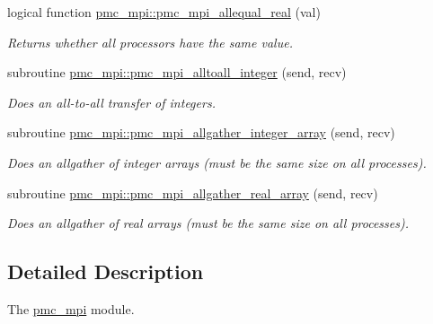\begin{DoxyCompactItemize}
logical function \mbox{\hyperlink{namespacepmc__mpi_a92d80c63cf20c10ce32e2e8e5cb81c18}{pmc\+\_\+mpi\+::pmc\+\_\+mpi\+\_\+allequal\+\_\+real}} (val)
\begin{DoxyCompactList}\small\item\em Returns whether all processors have the same value. \end{DoxyCompactList}\item 
subroutine \mbox{\hyperlink{namespacepmc__mpi_ac7882ff99a49670f3601c32959f517e1}{pmc\+\_\+mpi\+::pmc\+\_\+mpi\+\_\+alltoall\+\_\+integer}} (send, recv)
\begin{DoxyCompactList}\small\item\em Does an all-\/to-\/all transfer of integers. \end{DoxyCompactList}\item 
subroutine \mbox{\hyperlink{namespacepmc__mpi_af79ceb854ff634f821a291c373810765}{pmc\+\_\+mpi\+::pmc\+\_\+mpi\+\_\+allgather\+\_\+integer\+\_\+array}} (send, recv)
\begin{DoxyCompactList}\small\item\em Does an allgather of integer arrays (must be the same size on all processes). \end{DoxyCompactList}\item 
subroutine \mbox{\hyperlink{namespacepmc__mpi_a999792706377ad2876cbf470df97c26d}{pmc\+\_\+mpi\+::pmc\+\_\+mpi\+\_\+allgather\+\_\+real\+\_\+array}} (send, recv)
\begin{DoxyCompactList}\small\item\em Does an allgather of real arrays (must be the same size on all processes). \end{DoxyCompactList}\end{DoxyCompactItemize}


\subsection{Detailed Description}
The \mbox{\hyperlink{namespacepmc__mpi}{pmc\+\_\+mpi}} module. 

